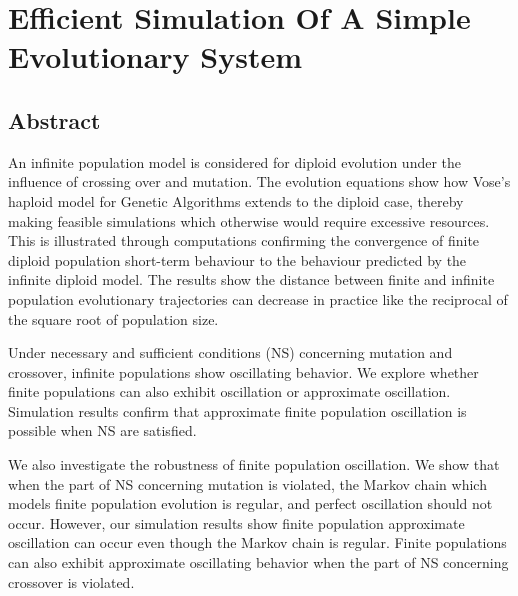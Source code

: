 
\chapter*{Efficient Simulation Of A Simple Evolutionary System}\label{ch:abstract}
\section*{Abstract}
An infinite population model is considered for diploid evolution under the influence of crossing over
and mutation. The evolution equations show how Vose's 
haploid model for Genetic Algorithms extends to the diploid case, thereby making feasible simulations
which otherwise would require excessive resources. This is illustrated through computations confirming
the convergence of finite diploid population short-term behaviour to the behaviour predicted by the
infinite diploid model. The results show the distance between finite and infinite population evolutionary trajectories can 
decrease in practice like the reciprocal of the square root of population size. 

Under necessary and sufficient conditions (NS) concerning mutation and crossover, 
infinite populations show oscillating behavior. 
We explore whether finite populations can also exhibit oscillation or approximate oscillation. 
Simulation results confirm that approximate finite population oscillation is possible when NS are satisfied. 

We also investigate the robustness of finite population oscillation.  
We show that when the part of NS concerning mutation is violated, 
the Markov chain which models finite population evolution is regular, 
and perfect oscillation  should not occur.
However, our simulation results show finite population 
approximate oscillation can occur even though the Markov chain is regular. 
Finite populations can also exhibit approximate oscillating behavior when the part of NS concerning crossover is violated. 



